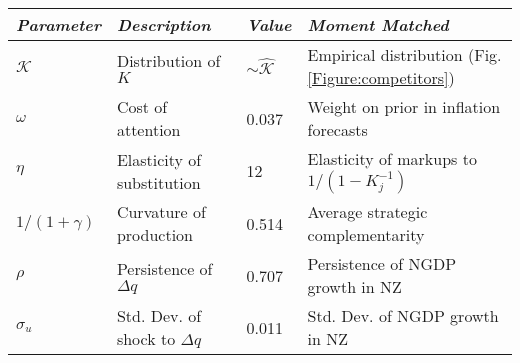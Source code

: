 \begin{tabular}{llll}
\hline\hline
\emph{Parameter} & \emph{Description} & \emph{Value} & \emph{Moment Matched}\\
\hline 
{$\mathcal{K}$} & {Distribution of $K$} & {$\sim \hat{\mathcal{K}}$} & {Empirical distribution (Fig. \ref{Figure:competitors})}\\
{$\omega$} & {Cost of attention} & {0.037} & {Weight on prior in inflation forecasts}\\
{$\eta$} & {Elasticity of substitution} & {12} & {Elasticity of markups to ${1/(1-K_j^{-1})}$}\\
{$1/(1+\gamma)$} & {Curvature of production} & {0.514} & {Average strategic complementarity}\\
{$\rho$} & {Persistence of $\Delta q$} & {0.707} & {Persistence of NGDP growth in NZ}\\ 
{$\sigma_u$} & {Std. Dev. of shock to $\Delta q$} & {0.011} & {Std. Dev. of NGDP growth in NZ}\\
\hline 
\end{tabular}
